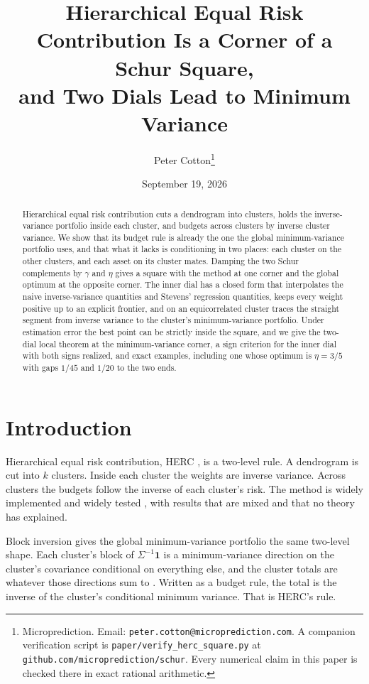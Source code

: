 \documentclass[11pt]{article}
\title{Hierarchical Equal Risk Contribution Is a Corner of a Schur Square,\\
and Two Dials Lead to Minimum Variance}
\author{Peter Cotton\thanks{Microprediction.
Email: \texttt{peter.cotton@microprediction.com}. A companion
verification script is \texttt{paper/verify\_herc\_square.py}
at \texttt{github.com/microprediction/schur}. Every numerical claim in
this paper is checked there in exact rational arithmetic.}}
\date{September 19, 2026}
\newcommand{\ones}{\mathbf{1}}
\begin{document}
\maketitle

\begin{abstract}
Hierarchical equal risk contribution cuts a dendrogram into clusters,
holds the inverse-variance portfolio inside each cluster, and budgets
across clusters by inverse cluster variance. We show that its budget rule
is already the one the global minimum-variance portfolio uses, and that
what it lacks is conditioning in two places: each cluster on the other
clusters, and each asset on its cluster mates. Damping the two Schur
complements by $\gamma$ and $\eta$ gives a square with the method at one
corner and the global optimum at the opposite corner. The inner dial has a
closed form that interpolates the naive inverse-variance quantities and
Stevens' regression quantities, keeps every weight positive up to an
explicit frontier, and on an equicorrelated cluster traces the straight
segment from inverse variance to the cluster's minimum-variance portfolio.
Under estimation error the best point can be strictly inside the square,
and we give the two-dial local theorem at the minimum-variance corner, a
sign criterion for the inner dial with both signs realized, and exact
examples, including one whose optimum is $\eta=3/5$ with gaps $1/45$ and
$1/20$ to the two ends.
\end{abstract}

\section{Introduction}

Hierarchical equal risk contribution, HERC \cite{raffinot2018}, is a
two-level rule. A dendrogram is cut into $k$ clusters. Inside each cluster
the weights are inverse variance. Across clusters the budgets follow the
inverse of each cluster's risk. The method is widely implemented
\cite{riskfolio,skfolio,mlfinlab} and widely tested
\cite{trucios2026,huang2022,sjostrand2020}, with results that are mixed and
that no theory has explained.

Block inversion gives the global minimum-variance portfolio the same
two-level shape. Each cluster's block of $\Sigma^{-1}\ones$ is a
minimum-variance direction on the cluster's covariance conditional on
everything else, and the cluster totals are whatever those directions sum
to \cite{cotton2024schur}. Written as a budget rule, the total is the
inverse of the cluster's conditional minimum variance. That is HERC's rule.
\end{document}
